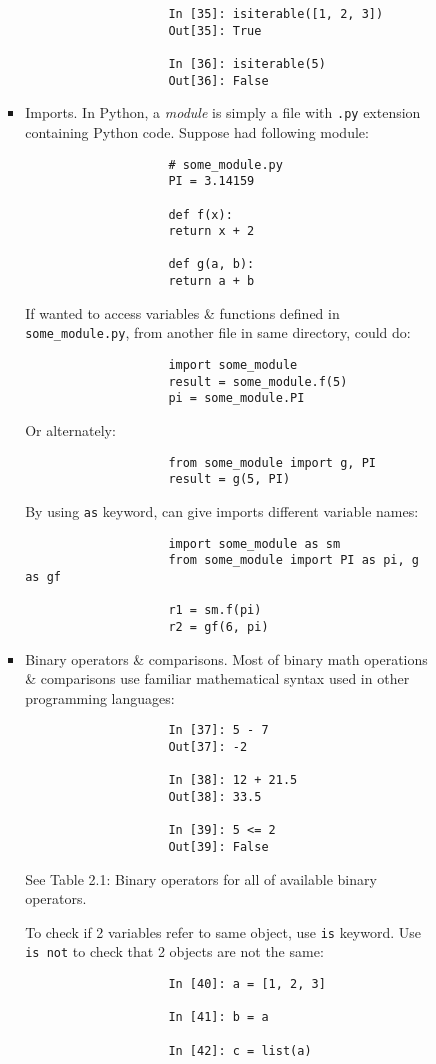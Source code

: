 \documentclass{article}
\begin{document}
\begin{itemize}
\begin{itemize}
\begin{itemize}
\begin{itemize}
\begin{verbatim}
					In [35]: isiterable([1, 2, 3])
					Out[35]: True
					
					In [36]: isiterable(5)
					Out[36]: False
				\end{verbatim}
				\item {\sf Imports.} In Python, a {\it module} is simply a file with {\tt.py} extension containing Python code. Suppose had following module:
				\begin{verbatim}
					# some_module.py
					PI = 3.14159
					
					def f(x):
					return x + 2
					
					def g(a, b):
					return a + b
				\end{verbatim}
				If wanted to access variables \& functions defined in \verb|some_module.py|, from another file in same directory, could do:
				\begin{verbatim}
					import some_module
					result = some_module.f(5)
					pi = some_module.PI
				\end{verbatim}
				Or alternately:
				\begin{verbatim}
					from some_module import g, PI
					result = g(5, PI)
				\end{verbatim}
				By using {\tt as} keyword, can give imports different variable names:
				\begin{verbatim}
					import some_module as sm
					from some_module import PI as pi, g as gf
					
					r1 = sm.f(pi)
					r2 = gf(6, pi)
				\end{verbatim}
				\item {\sf Binary operators \& comparisons.} Most of binary math operations \& comparisons use familiar mathematical syntax used in other programming languages:
				\begin{verbatim}
					In [37]: 5 - 7
					Out[37]: -2
					
					In [38]: 12 + 21.5
					Out[38]: 33.5
					
					In [39]: 5 <= 2
					Out[39]: False
				\end{verbatim}
				See {\sf Table 2.1: Binary operators} for all of available binary operators.
				
				To check if 2 variables refer to same object, use {\tt is} keyword. Use {\tt is not} to check that 2 objects are not the same:
				\begin{verbatim}
					In [40]: a = [1, 2, 3]
					
					In [41]: b = a
					
					In [42]: c = list(a)
					

\end{verbatim}
\end{itemize}
\end{itemize}
\end{itemize}
\end{itemize}
\end{document}
